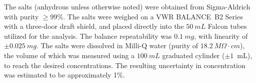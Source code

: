 \documentclass[journal=aesccq,manuscript=article]{achemso}
\begin{document}
The salts (anhydrous unless otherwise noted) were obtained from Sigma-Aldrich with purity $\geq 99\%$. 
The salts were weighed on a VWR BALANCE~B2 Series with a three-door draft shield, and placed directly into the $\SI{50}{mL}$ Falcon tubes utilized for the analysis. 
The balance repeatability was $\SI{0.1}{mg}$, with linearity of $\pm \SI{0.025}{mg}$. 
The salts were dissolved in Milli-Q water (purity of $\SI{18.2}{M \Omega \cdot cm}$), the volume of which was measured using a $\SI{100}{mL}$ graduated cylinder ($\pm 1$~mL), to reach the desired concentrations. 
The resulting uncertainty in concentration was estimated to be approximately 1\%.

\end{document}
